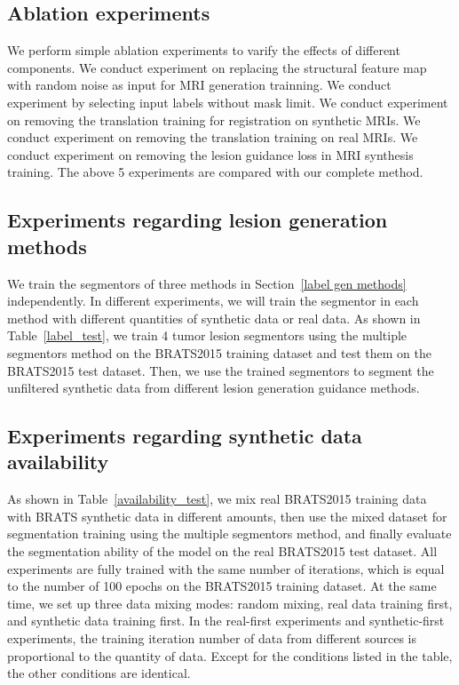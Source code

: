 \documentclass{ecai}
\begin{document}
\subsection{Ablation experiments}
We perform simple ablation experiments to varify the effects of different components. We conduct experiment on replacing the structural feature map with random noise as input for MRI generation trainning. We conduct experiment by selecting input labels without mask limit. We conduct experiment on removing the translation training for registration on synthetic MRIs. We conduct experiment on removing the translation training on real MRIs. We conduct experiment on removing the lesion guidance loss in MRI synthesis training. The above 5 experiments are compared with our complete method.

\subsection{Experiments regarding lesion generation methods}
\label{label gen methods tests}
We train the segmentors of three methods in Section~\ref{label gen methods} independently. In different experiments, we will train the segmentor in each method with different quantities of synthetic data or real data. As shown in Table~\ref{label_test}, we train 4 tumor lesion segmentors using the multiple segmentors method on the BRATS2015 training dataset and test them on the BRATS2015 test dataset. Then, we use the trained segmentors to segment the unfiltered synthetic data from different lesion generation guidance methods.

\subsection{Experiments regarding synthetic data availability}
As shown in Table~\ref{availability_test}, we mix real BRATS2015 training data with BRATS synthetic data in different amounts, then use the mixed dataset for segmentation training using the multiple segmentors method, and finally evaluate the segmentation ability of the model on the real BRATS2015 test dataset. All experiments are fully trained with the same number of iterations, which is equal to the number of 100 epochs on the BRATS2015 training dataset. At the same time, we set up three data mixing modes: random mixing, real data training first, and synthetic data training first. In the real-first experiments and synthetic-first experiments, the training iteration number of data from different sources is proportional to the quantity of data. Except for the conditions listed in the table, the other conditions are identical.
\end{document}
